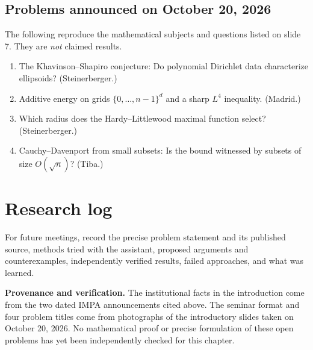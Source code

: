 \subsection{Problems announced on October 20, 2026}
\label{section-ai4math-first-problems}
The following reproduce the mathematical subjects and questions
listed on slide 7. They are \emph{not} claimed results.
\begin{enumerate}
\item The Khavinson--Shapiro conjecture:
Do polynomial Dirichlet data characterize ellipsoids?
(Steinerberger.)
\item Additive energy on grids
$\{0,\ldots,n-1\}^{d}$ and a sharp $L^{4}$ inequality.
(Madrid.)
\item Which radius does the Hardy--Littlewood maximal function
select? (Steinerberger.)
\item Cauchy--Davenport from small subsets:
Is the bound witnessed by subsets of size $O(\sqrt{n})$?
(Tiba.)
\end{enumerate}

\section{Research log}
\label{section-ai4math-research-log}
For future meetings, record the precise problem statement and
its published source, methods tried with the assistant, proposed
arguments and counterexamples, independently verified results,
failed approaches, and what was learned.

\medskip\noindent
\textbf{Provenance and verification.}
The institutional facts in the introduction come from the two
dated IMPA announcements cited above. The seminar format and
four problem titles come from photographs of the introductory
slides taken on October 20, 2026. No mathematical proof or
precise formulation of these open problems has yet been
independently checked for this chapter.

